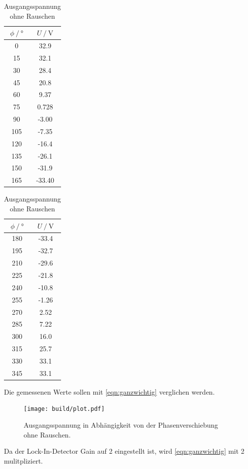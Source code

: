 \begin{table}
  \centering
  \caption{Ausgangsspannung ohne Rauschen}
  \label{tab:ohne_Rauschen}
  \begin{subtable}{0.48\textwidth}
  \centering
  \begin{tabular}{cc}
    \toprule {$\phi \:/\: °$} & {$U \:/\: \si{\volt}$} \\
    \midrule
     0  & 32.9  \\
     15  & 32.1  \\
     30 & 28.4 \\
     45 & 20.8 \\
     60 & 9.37 \\
     75 & 0.728\\
     90 & -3.00 \\
     105 & -7.35  \\
     120 & -16.4 \\
     135 & -26.1 \\
     150 & -31.9  \\
     165 & -33.40 \\
  \bottomrule
  \end{tabular}
  \end{subtable}
  \begin{subtable}{0.48\textwidth}
  \centering
  \begin{tabular}{cc}
    \toprule {$\phi \:/\: °$} & {$U \:/\: \si{\volt}$} \\
    \midrule
     180 & -33.4  \\
     195 & -32.7  \\
     210 & -29.6  \\
     225 & -21.8  \\
     240 & -10.8\\
     255 & -1.26  \\
     270 & 2.52  \\
     285 & 7.22  \\
     300 & 16.0 \\
     315 & 25.7 \\
     330 & 33.1 \\
     345 & 33.1 \\
  \bottomrule
  \end{tabular}
  \end{subtable}
\end{table}

Die gemessenen Werte sollen mit \ref{eqn:ganzwichtig} verglichen werden.

\begin{figure}
  \centering
  \texttt{[image: build/plot.pdf]}
\caption{Ausgangsspannung in Abhängigkeit von der Phasenverschiebung ohne Rauschen.}
  \label{fig:ohne_rauschen}
\end{figure}
Da der Lock-In-Detector Gain auf 2 eingestellt ist, wird \ref{eqn:ganzwichtig} mit 2 mulitpliziert.

